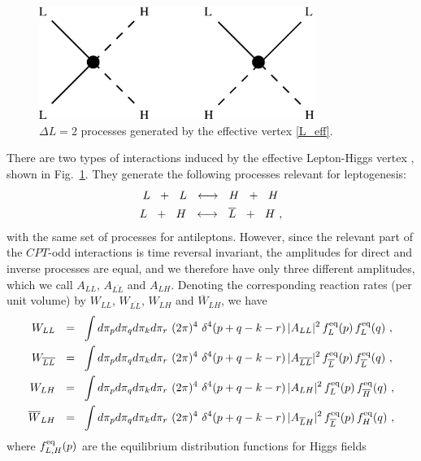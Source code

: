 \documentclass[12pt]{revtex4}
\newcommand{\eq}{{\rm eq}}
\newcommand{\ov}{\overline}
\begin{document}
\begin{figure}
\includegraphics[width=9cm]{lflip.eps}
\caption{$\Delta L=2$ processes generated by the effective vertex \eqref{L_eff}.}
\label{lflip_fig}
\end{figure}
There are two types of interactions induced by the effective
Lepton-Higgs vertex \cite{Luty:1992un,Plumacher:1996kc}, 
shown in  Fig.~\ref{lflip_fig}.
They generate the following processes relevant for leptogenesis:
\begin{align}
\notag
	L~~+~~L ~~\longleftrightarrow~~ H~~+~~H~  \\
\notag
	L~~+~~H ~~\longleftrightarrow~~ \ov{L}~~+~~H~,
\end{align}
with the same set of processes
for antileptons.
However, since the relevant part of the $CPT$-odd interactions is time reversal invariant, 
the amplitudes for
direct and inverse processes are equal, and we therefore have 
only three different amplitudes, which we call  
$ A_{LL} $, $ A_{\ov{LL}} $ and $ A_{LH} $.
Denoting the corresponding reaction rates (per unit volume) by
$ W_{LL} $, $ W_{\ov{LL}} $, $ W_{L{H}} $ and $ \ov{W}_{L{H}} $,
we have 
\begin{align*}
	W_{LL}   ~~=~~  &
		\int d\pi_p d\pi_q d\pi_k d\pi_r ~
		(2\pi)^4~ \delta^4 ( p + q - k - r )\,
		| A_{LL} |^2\, f_L^\eq(p)\, f_L^\eq(q)~, \\
	W_{\ov{LL}}   ~~=~~  &
		\int d\pi_p d\pi_q d\pi_k d\pi_r ~
		(2\pi)^4~ \delta^4 ( p + q - k - r )\,
		| A_{\ov{LL}} |^2\, f_{\ov{L}}^\eq(p)\, f_{\ov{L}}^\eq(q)~, \\
	W_{LH}  ~~=~~  &
		\int d\pi_p d\pi_q d\pi_k d\pi_r ~
		(2\pi)^4~ \delta^4 ( p + q - k - r )\,
		| A_{L{H}} |^2\, f_{{L}}^\eq(p)\, f_{\ov{H}}^\eq(q)~, \\
	\ov{W}_{LH}  ~~=~~  &
		\int d\pi_p d\pi_q d\pi_k d\pi_r ~
		(2\pi)^4~ \delta^4 ( p + q - k - r )\,
		| A_{\ov{L}{H} }|^2\, f_{\ov{L}}^\eq(p)\, f_{H}^\eq(q)~,
\end{align*}
	where $ f_{L,H}^\eq(p) $ are the equilibrium distribution functions for Higgs fields
\end{document}
